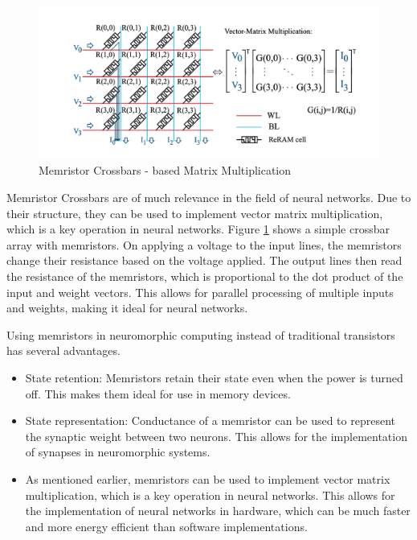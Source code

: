 \documentclass[screen, acmtog]{acmart}
\begin{document}
\begin{figure}
    \centering
    \includegraphics[width=1\linewidth]{memristor-crossbar.png}
    \caption{Memristor Crossbars - based Matrix Multiplication \cite{MemristorProgress}}
    \label{fig:mem-cross}
\end{figure}

Memristor Crossbars are of much relevance in the field of neural networks. Due to their structure, they can be used to implement vector matrix multiplication, which is a key operation in neural networks. Figure \ref{fig:mem-cross} shows a simple crossbar array with memristors. On applying a voltage to the input lines, the memristors change their resistance based on the voltage applied. The output lines then read the resistance of the memristors, which is proportional to the dot product of the input and weight vectors. This allows for parallel processing of multiple inputs and weights, making it ideal for neural networks.

Using memristors in neuromorphic computing instead of traditional transistors has several advantages. 

\begin{itemize}
    \item State retention: Memristors retain their state even when the power is turned off. This makes them ideal for use in memory devices.
    \item State representation: Conductance of a memristor can be used to represent the synaptic weight between two neurons. This allows for the implementation of synapses in neuromorphic systems.
    \item As mentioned earlier, memristors can be used to implement vector matrix multiplication, which is a key operation in neural networks. This allows for the implementation of neural networks in hardware, which can be much faster and more energy efficient than software implementations.
\end{itemize}
\end{document}
